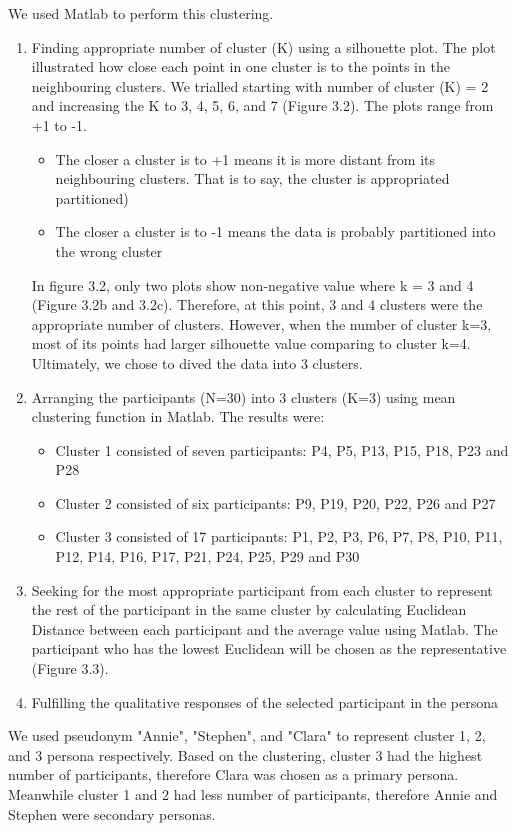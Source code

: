 We used Matlab to perform this clustering. 
\begin{enumerate} 
\item Finding appropriate number of cluster (K) using a silhouette plot. The plot illustrated how close each point in one cluster is to the points in the neighbouring clusters. We trialled starting with number of cluster (K) = 2 and increasing the K to 3, 4, 5, 6, and 7 (Figure 3.2). The plots range from +1 to -1. 
\begin{itemize}
\item The closer a cluster is to +1 means it is more distant from its neighbouring clusters. That is to say, the cluster is appropriated partitioned)
\item The closer a cluster is to -1 means the data is probably partitioned into the wrong cluster 
\end{itemize}

In figure 3.2, only two plots show non-negative value where k = 3 and 4 (Figure 3.2b and 3.2c). Therefore, at this point, 3 and 4 clusters were the appropriate number of clusters. However, when the number of cluster k=3, most of its points had larger silhouette value comparing to cluster k=4. Ultimately, we chose to dived the data into 3 clusters. 

\item Arranging the participants (N=30)  into 3 clusters (K=3) using mean clustering function in Matlab. The results were: 
\begin{itemize}
\item Cluster 1 consisted of seven participants: P4, P5, P13, P15, P18, P23 and P28
\item Cluster 2 consisted of six participants: P9, P19, P20, P22, P26 and P27
\item Cluster 3 consisted of 17 participants: P1, P2, P3, P6, P7, P8, P10, P11, P12, P14, P16, P17, P21, P24, P25, P29 and P30 
\end{itemize}

\item Seeking for the most appropriate participant from each cluster to represent the rest of the participant in the same cluster by calculating Euclidean Distance between each participant and the average value using Matlab. The participant who has the lowest Euclidean will be chosen as the representative (Figure 3.3). 
\item Fulfilling the qualitative responses of the selected participant in the persona

\end{enumerate}
We used pseudonym "Annie", "Stephen", and "Clara" to represent cluster 1, 2, and 3 persona respectively. Based on the clustering, cluster 3 had the highest number of participants, therefore Clara was chosen as a primary persona. Meanwhile cluster 1 and 2 had less number of participants, therefore Annie and Stephen were secondary personas. 

